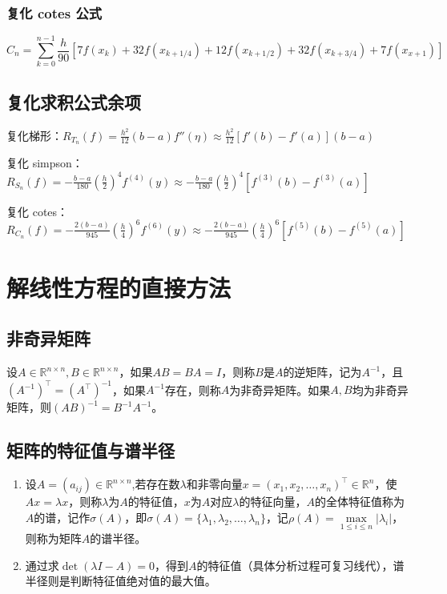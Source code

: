 \documentclass[UTF8,a4paper,11pt,oneside]{ctexbook}
\begin{document}
\subsection{复化 cotes 公式}
\[
C_n=\sum_{k=0}^{n-1}\frac{h}{90}[7f(x_k)+32f(x_{k+1/4})+12f(x_{k+1/2})+32f(x_{k+3/4})+7f(x_{x+1})]
\]

\section{复化求积公式余项}

复化梯形：\(R_{T_n}(f)=\frac{h^2}{12}(b-a)f''(\eta)\approx\frac{h^2}{12}[f'(b)-f'(a)](b-a)\)

复化 simpson：\(R_{S_n}(f)=-\frac{b-a}{180}\left(\frac{h}{2}\right)^4f^{(4)}(y)\approx-\frac{b-a}{180}\left(\frac{h}{2}\right)^4[f^{(3)}(b)-f^{(3)}(a)]\)

复化 cotes：\(R_{C_n}(f)=-\frac{2(b-a)}{945}\left(\frac{h}{4}\right)^6f^{(6)}(y)\approx-\frac{2(b-a)}{945}\left(\frac{h}{4}\right)^6[f^{(5)}(b)-f^{(5)}(a)]\)

\chapter{解线性方程的直接方法}

\section{非奇异矩阵}

设\(A\in\mathbb{R}^{n\times n},B\in\mathbb{R}^{n\times n}\)，如果\(AB=BA=I\)，则称\(B\)是\(A\)的逆矩阵，记为\(A^{-1}\)，且\((A^{-1})^\top=(A^\top)^{-1}\)，如果\(A^{-1}\)存在，则称\(A\)为非奇异矩阵。如果\(A,B\)均为非奇异矩阵，则\((AB)^{-1}=B^{-1}A^{-1}\)。

\section{矩阵的特征值与谱半径}
\begin{enumerate}
    \item 设\(A=(a_{ij})\in\mathbb{R}^{n\times n}\),若存在数\(\lambda\)和非零向量\(x=(x_1,x_2,\ldots,x_n)^\top\in\mathbb{R}^n\)，使\(Ax=\lambda x\)，则称\(\lambda\)为\(A\)的特征值，\(x\)为\(A\)对应\(\lambda\)的特征向量，\(A\)的全体特征值称为\(A\)的谱，记作\(\sigma(A)\)，即\(\sigma(A)=\{\lambda_1,\lambda_2,\ldots,\lambda_n\}\)，记\(\rho(A)=\max\limits_{1\leq i\leq n}|\lambda_i|\)，则称为矩阵\(A\)的谱半径。
    \item 通过求\(\det(\lambda I-A)=0\)，得到\(A\)的特征值（具体分析过程可复习线代），谱半径则是判断特征值绝对值的最大值。
\end{enumerate}
\end{document}
